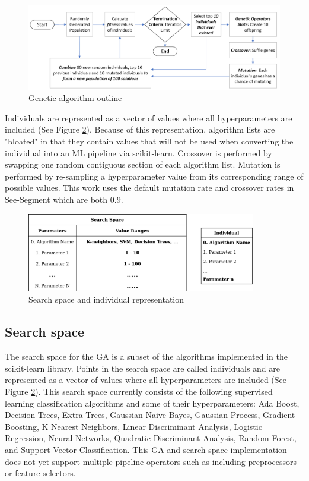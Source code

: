 \documentclass[acmsmall,screen]{acmart}
\begin{document}
\begin{figure}[h]
  \centering
  \includegraphics[width=14cm]{flowcharts/New_Diagram.png}
  \caption{Genetic algorithm outline}
  \label{fig:ga-flow}
\end{figure}

Individuals are represented as a vector of values where all hyperparameters are included (See Figure \ref{fig:representation}). Because of this representation, algorithm lists are "bloated" in that they contain values that will not be used when converting the individual into an ML pipeline via scikit-learn. Crossover is performed by swapping one random contiguous section of each algorithm list. Mutation is performed by re-sampling a hyperparameter value from its corresponding range of possible values. This work uses the default mutation rate and crossover rates in See-Segment which are both 0.9.

\begin{figure}[h]
  \centering
  \includegraphics[width=10cm]{flowcharts/see-classify-algo-representation-list represetation.drawio.png}
  \caption{Search space and individual representation}
  \label{fig:representation}
\end{figure}
\subsection{Search space} The search space for the GA is a subset of the algorithms implemented in the scikit-learn library. Points in the search space are called individuals and are represented as a vector of values where all hyperparameters are included (See Figure \ref{fig:representation}). This search space currently consists of the following supervised learning classification algorithms and some of their hyperparameters: Ada Boost, Decision Trees, Extra Trees, Gaussian Naive Bayes, Gaussian Process, Gradient Boosting, K Nearest Neighbors, Linear Discriminant Analysis, Logistic Regression, Neural Networks, Quadratic Discriminant Analysis, Random Forest, and Support Vector Classification. This GA and search space implementation does not yet support multiple pipeline operators such as including preprocessors or feature selectors.
\end{document}
